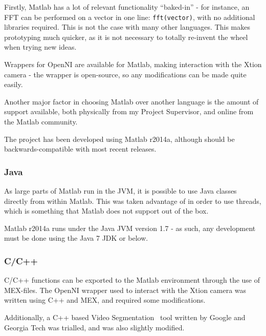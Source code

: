 Firstly, Matlab has a lot of relevant functionality ``baked-in'' - for instance, an \ac{FFT} can be performed on a vector in one line: \lstinline$fft(vector)$, with no additional libraries required. This is not the case with many other languages. This makes prototyping much quicker, as it is not necessary to totally re-invent the wheel when trying new ideas.

Wrappers for OpenNI are available for Matlab, making interaction with the Xtion camera - the wrapper is open-source, so any modifications can be made quite easily.

Another major factor in choosing Matlab over another language is the amount of support available, both physically from my Project Supervisor, and online from the Matlab community. 

The project has been developed using Matlab r2014a, although should be backwards-compatible with most recent releases. 

\subsubsection{Java}
As large parts of Matlab run in the \ac{JVM}, it is possible to use Java classes directly from within Matlab. This was taken advantage of in order to use threads, which is something that Matlab does not support out of the box. 

Matlab r2014a runs under the Java JVM version 1.7 - as such, any development must be done using the Java 7 JDK or below. 

\subsubsection{C/C++}
C/C++ functions can be exported to the Matlab environment through the use of MEX-files. The OpenNI wrapper used to interact with the Xtion camera was written using C++ and MEX, and required some modifications.

Additionally, a C++ based Video Segmentation~\cite{videosegment} tool written by Google and Georgia Tech was trialled, and was also slightly modified.
